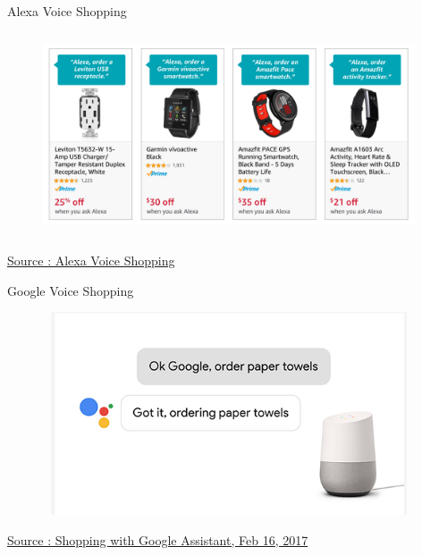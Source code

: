 \documentclass{beamer}
\begin{document}
\begin{frame}{Alexa Voice Shopping}
	\begin{figure}
	   \includegraphics[width=11cm, height=6cm]{figs/alexa_deals_3.png}
	\end{figure}
	\href{https://www.amazon.com/b?node=14552177011}{Source : Alexa Voice Shopping}
\end{frame}


\begin{frame}{Google Voice Shopping}
	\begin{figure}
	   \includegraphics[width=11cm, height=6cm]{figs/googlehome_voiceshopping.png}
	\end{figure}
	\href{https://blog.google/products/home/start-shopping-google-assistant-google-home/?}{Source : Shopping with Google Assistant, Feb 16, 2017}
\end{frame}


%

\end{document}
